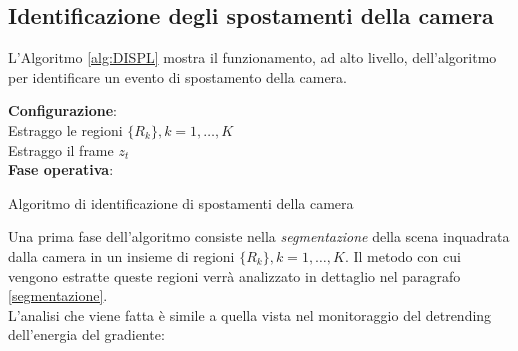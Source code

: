 \subsection{Identificazione degli spostamenti della camera}
\label{monitoraggioDISPL}
L'Algoritmo \ref{alg:DISPL} mostra il funzionamento, ad alto livello, dell'algoritmo per identificare un evento di spostamento della camera.\\
\begin{algorithm}[t]
	\LinesNumbered
	\textbf{Configurazione}:\\
	 Estraggo le regioni $\{R_k\}, k=1,\dots,K$  \\
	 
	{	 Estraggo il frame $z_t$ \\
		 
	}
	 
	\textbf{Fase operativa}:\\
	    
	\caption{Algoritmo di identificazione di spostamenti della camera}
	\label{alg:DISPL}
\end{algorithm}
Una prima fase dell'algoritmo consiste nella \textit{segmentazione} della scena inquadrata dalla camera in un insieme di regioni $\{R_k\}, k=1,\dots,K$.
Il metodo con cui vengono estratte queste regioni verr\`a analizzato in dettaglio nel paragrafo \ref{segmentazione}. \\
L'analisi che viene fatta \`e simile a quella vista nel monitoraggio del detrending dell'energia del gradiente:
